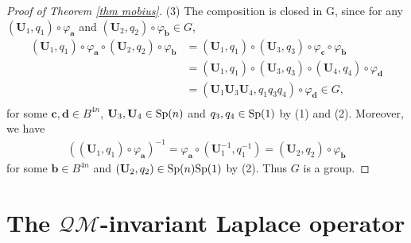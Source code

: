 \documentclass[a4paper,11pt]{amsart}
\numberwithin{equation}{section}
\begin{document}
\begin{proof}[Proof of Theorem \ref{thm mobius}]
(3)\; The composition is closed in G, since for any  $(\mathbf{U}_1,q_1)\circ \varphi_{\mathbf{a}}$ and $(\mathbf{U}_2,q_2)\circ \varphi_{\mathbf{b}}\in G$,
\begin{equation*}\begin{aligned}
(\mathbf{U}_1,q_1)\circ \varphi_{\mathbf{a}} \circ (\mathbf{U}_2,q_2)\circ \varphi_{\mathbf{b}}
&=(\mathbf{U}_1,q_1)\circ (\mathbf{U}_3,q_3) \circ \varphi_{\mathbf{c}}\circ\varphi_{\mathbf{b}}\\
&=(\mathbf{U}_1,q_1)\circ (\mathbf{U}_3,q_3)\circ (\mathbf{U}_4,q_4) \circ \varphi_{\mathbf{d}}\\
&=(\mathbf{U}_1\mathbf{U}_3\mathbf{U}_4,q_1q_3q_4)\circ\varphi_{\mathbf{d}}\in G,\\
\end{aligned}\end{equation*}
for some $\mathbf{c},\mathbf{d}\in B^{4n}$, $\mathbf{U}_3,\mathbf{U}_4\in {\rm Sp}(n)$ and $q_3, q_4\in {\rm Sp}(1)$ by (1) and (2). Moreover, we have
\begin{equation*}\begin{aligned}
((\mathbf{U}_1,q_1)\circ \varphi_{\mathbf{a}})^{-1}= \varphi_{\mathbf{a}}\circ (\mathbf{U}_1^{-1},q_1^{-1})=(\mathbf{U}_2,q_2)\circ\varphi_{\mathbf{b}}
\end{aligned}\end{equation*}
for some $\mathbf{b}\in B^{4n}$ and $(\mathbf{U}_2,q_2)\in {\rm Sp}(n){\rm Sp}(1)$ by (2). Thus $G $ is a group.
\end{proof}













\section{The $\mathcal{QM}$-invariant Laplace operator}
\end{document}
